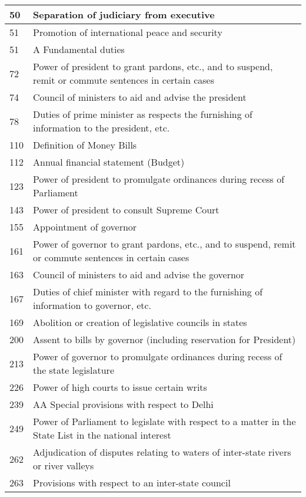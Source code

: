 \begin{longtable}[c]{@{}|p{2cm}|p{10cm}|@{}}
  50 & Separation of judiciary from executive \\ \midrule
  51 & Promotion of international peace and security \\ \midrule
  51 & A Fundamental duties \\ \midrule
  72 & Power of president to grant pardons, etc., and to suspend, remit or commute sentences in certain cases \\ \midrule
  74 & Council of ministers to aid and advise the president \\
  78 & Duties of prime minister as respects the furnishing of information to the president, etc. \\ \midrule
  110 & Definition of Money Bills \\ \midrule
  112 & Annual financial statement (Budget) \\ \midrule
  123 & Power of president to promulgate ordinances during recess of Parliament \\ \midrule
  143 & Power of president to consult Supreme Court \\ \midrule
  155 & Appointment of governor \\ \midrule
  161 & Power of governor to grant pardons, etc., and to suspend, remit or commute sentences in certain cases \\ \midrule
  163 & Council of ministers to aid and advise the governor \\ \midrule
  167 & Duties of chief minister with regard to the furnishing of information to governor, etc. \\ \midrule
  169 & Abolition or creation of legislative councils in states \\ \midrule
  200 & Assent to bills by governor (including reservation for President) \\ \midrule
  213 & Power of governor to promulgate ordinances during recess of the state legislature \\ \midrule
  226 & Power of high courts to issue certain writs \\ \midrule
  239 & AA Special provisions with respect to Delhi \\ \midrule
  249 & Power of Parliament to legislate with respect  to a matter in the State List in the national interest \\ \midrule
  262 & Adjudication of disputes relating to waters of inter-state rivers or river valleys \\ \midrule
  263 & Provisions with respect to an inter-state council \\ \midrule

\end{longtable}
